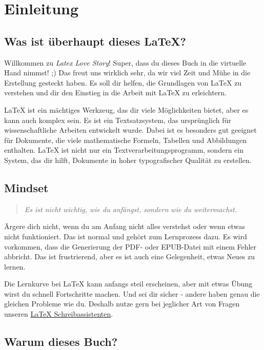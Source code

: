 \chapter{Einleitung}

\section{ Was ist überhaupt dieses \LaTeX{}?}

Willkommen zu \textit{Latex Love Story}! Super, dass du dieses Buch in die virtuelle Hand nimmst! ;)
Das freut uns wirklich sehr, da wir viel Zeit und Mühe in die Erstellung gesteckt haben.
Es soll dir helfen, die Grundlagen von \LaTeX{} zu verstehen und dir den Einstieg in die Arbeit mit \LaTeX{} zu erleichtern.

\LaTeX{} ist ein mächtiges Werkzeug, das dir viele Möglichkeiten bietet, aber es kann auch komplex sein.
Es ist ein Textsatzsystem, das ursprünglich für wissenschaftliche Arbeiten entwickelt wurde.
Dabei ist es besonders gut geeignet für Dokumente, die viele mathematische Formeln, Tabellen und Abbildungen enthalten.
\LaTeX{} ist nicht nur ein Textverarbeitungsprogramm, sondern ein System, das dir hilft, Dokumente in hoher typografischer Qualität zu erstellen.


\section{Mindset}
\begin{quote}
    \textit{Es ist nicht wichtig, wie du anfängst, sondern wie du weitermachst.}
\end{quote}

Ärgere dich nicht, wenn du am Anfang nicht alles verstehst oder wenn etwas nicht funktioniert.
Das ist normal und gehört zum Lernprozess dazu.
Es wird vorkommen, dass die Generierung der PDF- oder EPUB-Datei mit einem Fehler abbricht.
Das ist frustrierend, aber es ist auch eine Gelegenheit, etwas Neues zu lernen.

Die Lernkurve bei \LaTeX{} kann anfangs steil erscheinen, aber mit etwas Übung wirst du schnell Fortschritte machen.
Und sei dir sicher - andere haben genau die gleichen Probleme wie du.
Deshalb nutze gern bei jeglicher Art von Fragen unseren \href{https://chatgpt.com/g/g-68386eb107ac8191aa5beeb7ce8f2fdc-latex-schreibassistent}{LaTeX{} Schreibassistenten}.

\section{Warum dieses Buch?}

